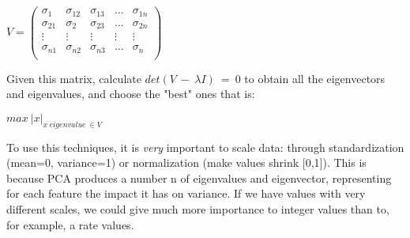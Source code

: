 $
V = 
	\begin{pmatrix}
		\sigma_{1} & \sigma_{12} & \sigma_{13} & \dots & \sigma_{1n}\\
		\sigma_{21} & \sigma_{2} & \sigma_{23} & \dots & \sigma_{2n}\\
		\vdots & \vdots & \vdots & \vdots & \vdots\\
		\sigma_{n1} & \sigma_{n2} & \sigma_{n3} & \dots & \sigma_{n}\\
	\end{pmatrix}
$

Given this matrix, calculate $det(V\ -\ \lambda I)\ = \ 0$ to obtain all the eigenvectors and eigenvalues, and choose the "best" ones that is:\newline\newline
\begin{center}
 $max\ | x |_{x\ eigenvalue\ \in V}$\newline\newline
\end{center}
To use this techniques, it is \emph{very} important to scale data: through standardization (mean=0, variance=1) or normalization (make values shrink [0,1]). This is because PCA produces a number n of eigenvalues and eigenvector, representing for each feature the impact it has on variance. If we have values with very different scales, we could give much more importance to integer values than to, for example, a rate values.
